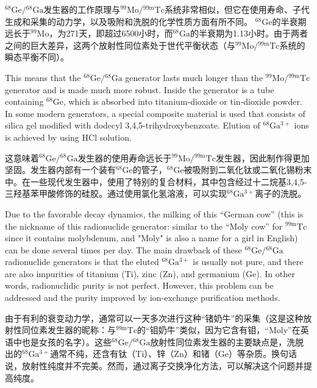\documentclass[dvipsnames, svgnames,a4paper,11pt]{article}
\begin{document}
\(\mathrm{^{68}Ge}/\mathrm{^{68}Ga}\)发生器的工作原理与\(\mathrm{^{99}Mo}/\mathrm{^{99m}Tc}\)系统非常相似，但它在使用寿命、子代生成和采集的动力学，以及吸附和洗脱的化学性质方面有所不同。 \(\mathrm{^{68}Ge}\)的半衰期远长于\(\mathrm{^{99}Mo}\)，为271天，即超过6500小时，而\(\mathrm{^{68}Ga}\)的半衰期为1.13小时。由于两者之间的巨大差异，这两个放射性同位素处于世代平衡状态（与\(\mathrm{^{99}Mo}/\mathrm{^{99m}Tc}\)系统的瞬态平衡不同）。  

This means that the \(\mathrm{^{68}Ge}/\mathrm{^{68}Ga}\) generator lasts much longer than the \(\mathrm{^{99}Mo}/\mathrm{^{99m}Tc}\) generator and is made much more robust. Inside the generator is a tube containing \(\mathrm{^{68}Ge}\), which is absorbed into titanium-dioxide or tin-dioxide powder. In some modern generators, a special composite material is used that consists of silica gel modified with dodecyl 3,4,5-trihydroxybenzoate. Elution of \(\mathrm{^{68}Ga^{3+}}\) ions is achieved by using HCl solution.  

这意味着\(\mathrm{^{68}Ge}/\mathrm{^{68}Ga}\)发生器的使用寿命远长于\(\mathrm{^{99}Mo}/\mathrm{^{99m}Tc}\)发生器，因此制作得更加坚固。发生器内部有一个装有\(\mathrm{^{68}Ge}\)的管子，\(\mathrm{^{68}Ge}\)被吸附到二氧化钛或二氧化锡粉末中。在一些现代发生器中，使用了特别的复合材料，其中包含经过十二烷基3,4,5-三羟基苯甲酸修饰的硅胶。通过使用氯化氢溶液，可以实现\(\mathrm{^{68}Ga^{3+}}\)离子的洗脱。  


Due to the favorable decay dynamics, the milking of this “German cow” (this is the nickname of this radionuclide generator: similar to the “Moly cow” for \(\mathrm{^{99m}Tc}\) since it contains molybdenum, and "Moly" is also a name for a girl in English) can be done several times per day. The main drawback of these \(\mathrm{^{68}Ge}/\mathrm{^{68}Ga}\) radionuclide generators is that the eluted \(\mathrm{^{68}Ga^{3+}}\) is usually not pure, and there are also impurities of titanium (\(\mathrm{Ti}\)), zinc (\(\mathrm{Zn}\)), and germanium (\(\mathrm{Ge}\)). In other words, radionuclidic purity is not perfect. However, this problem can be addressed and the purity improved by ion-exchange purification methods.

由于有利的衰变动力学，通常可以一天多次进行这种“锗奶牛”的采集（这是这种放射性同位素发生器的昵称：与\(\mathrm{^{99m}Tc}\)的“钼奶牛”类似，因为它含有钼，“Moly”在英语中也是女孩的名字）。这些\(\mathrm{^{68}Ge}/\mathrm{^{68}Ga}\)放射性同位素发生器的主要缺点是，洗脱出的\(\mathrm{^{68}Ga^{3+}}\)通常不纯，还含有钛（\(\mathrm{Ti}\)）、锌（\(\mathrm{Zn}\)）和锗（\(\mathrm{Ge}\)）等杂质。换句话说，放射性纯度并不完美。然而，通过离子交换净化方法，可以解决这个问题并提高纯度。
\end{document}
